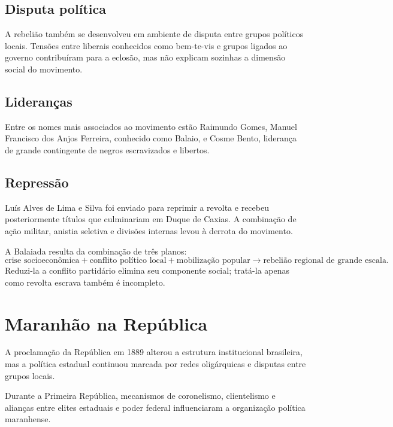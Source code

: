 \subsection{Disputa política}

A rebelião também se desenvolveu em ambiente de disputa entre grupos políticos locais. Tensões entre liberais conhecidos como bem-te-vis e grupos ligados ao governo contribuíram para a eclosão, mas não explicam sozinhas a dimensão social do movimento.

\subsection{Lideranças}

Entre os nomes mais associados ao movimento estão Raimundo Gomes, Manuel Francisco dos Anjos Ferreira, conhecido como Balaio, e Cosme Bento, liderança de grande contingente de negros escravizados e libertos.

\subsection{Repressão}

Luís Alves de Lima e Silva foi enviado para reprimir a revolta e recebeu posteriormente títulos que culminariam em Duque de Caxias. A combinação de ação militar, anistia seletiva e divisões internas levou à derrota do movimento.

\begin{teoria}
A Balaiada resulta da combinação de três planos:
\[
\text{crise socioeconômica}
+
\text{conflito político local}
+
\text{mobilização popular}
\rightarrow
\text{rebelião regional de grande escala}.
\]
Reduzi-la a conflito partidário elimina seu componente social; tratá-la apenas como revolta escrava também é incompleto.
\end{teoria}

\section{Maranhão na República}

A proclamação da República em 1889 alterou a estrutura institucional brasileira, mas a política estadual continuou marcada por redes oligárquicas e disputas entre grupos locais.

Durante a Primeira República, mecanismos de coronelismo, clientelismo e alianças entre elites estaduais e poder federal influenciaram a organização política maranhense.

